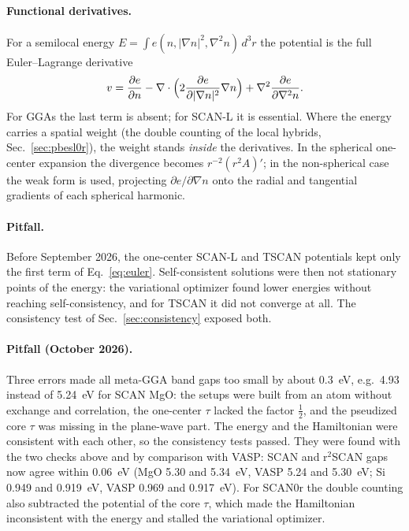 \documentclass[11pt,a4paper,oneside]{book}
\begin{document}
\paragraph{Functional derivatives.} For a semilocal energy
$E=\int e(n,|\nabla n|^2,\nabla^2 n)\,d^3r$ the potential is the full
Euler--Lagrange derivative
\begin{equation}
  v = \frac{\partial e}{\partial n}
  - \nabla\cdot\Bigl(2\frac{\partial e}{\partial|\nabla n|^2}\nabla n\Bigr)
  + \nabla^2\frac{\partial e}{\partial \nabla^2 n}.
  \label{eq:euler}
\end{equation}
For GGAs the last term is absent; for SCAN-L it is essential. Where the
energy carries a spatial weight (the double counting of the local
hybrids, Sec.~\ref{sec:pbesl0r}), the weight stands \emph{inside} the
derivatives. In the spherical one-center expansion the divergence
becomes $r^{-2}(r^2 A)'$; in the non-spherical case the weak form is
used, projecting $\partial e/\partial\nabla n$ onto the radial and
tangential gradients of each spherical harmonic.

\paragraph{Pitfall.} Before September 2026, the one-center SCAN-L and
TSCAN potentials kept only the first term of Eq.~\eqref{eq:euler}.
Self-consistent solutions were then not stationary points of the energy:
the variational optimizer found lower energies without reaching
self-consistency, and for TSCAN it did not converge at all. The
consistency test of Sec.~\ref{sec:consistency} exposed both.

\paragraph{Pitfall (October 2026).} Three errors made all meta-GGA band
gaps too small by about 0.3~eV, e.g.\ 4.93 instead of 5.24~eV for SCAN MgO:
the setups were built from an atom without exchange and correlation, the
one-center $\tau$ lacked the factor $\frac12$, and the pseudized core
$\tau$ was missing in the plane-wave part. The energy and the
Hamiltonian were consistent with each other, so the consistency tests
passed. They were found with the two checks above and by comparison
with VASP: SCAN and r$^2$SCAN gaps now agree within 0.06~eV (MgO 5.30
and 5.34~eV, VASP 5.24 and 5.30~eV; Si 0.949 and 0.919~eV, VASP 0.969
and 0.917~eV). For SCAN0r the double counting also subtracted the
potential of the core $\tau$, which made the Hamiltonian inconsistent
with the energy and stalled the variational optimizer.
\end{document}
